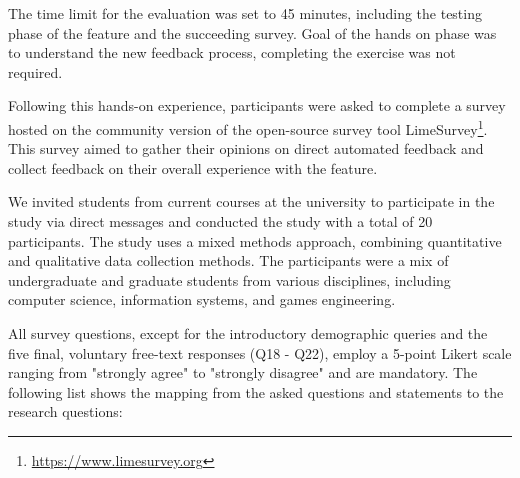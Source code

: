 \documentclass[manuscript,screen,review]{acmart}
\begin{document}
The time limit for the evaluation was set to 45 minutes, including the testing phase of the feature and the succeeding survey.
Goal of the hands on phase was to understand the new feedback process, completing the exercise was not required.

Following this hands-on experience, participants were asked to complete a survey hosted on the community version of the open-source survey tool LimeSurvey\footnote{\url{https://www.limesurvey.org}}.
This survey aimed to gather their opinions on direct automated feedback and collect feedback on their overall experience with the feature.

We invited students from current courses at the university to participate in the study via direct messages and conducted the study with a total of 20 participants.
The study uses a mixed methods approach, combining quantitative and qualitative data collection methods. 
The participants were a mix of undergraduate and graduate students from various disciplines, including computer science, information systems, and games engineering.

All survey questions, except for the introductory demographic queries and the five final, voluntary free-text responses (Q18 - Q22), employ a 5-point Likert scale \cite{allen:2007:LikertScalesData} ranging from "strongly agree" to "strongly disagree" and are mandatory.
The following list shows the mapping from the asked questions and statements to the research questions:
\end{document}
